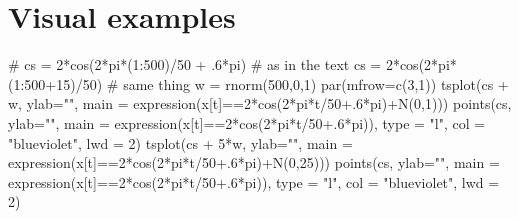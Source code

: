 \documentclass[
  letterpaper,
  DIV=11,
  numbers=noendperiod]{scrreprt}
\newenvironment{Shaded}{\begin{snugshade}}{\end{snugshade}}
\newcommand{\AttributeTok}[1]{\textcolor[rgb]{0.40,0.45,0.13}{#1}}
\newcommand{\CommentTok}[1]{\textcolor[rgb]{0.37,0.37,0.37}{#1}}
\newcommand{\DecValTok}[1]{\textcolor[rgb]{0.68,0.00,0.00}{#1}}
\newcommand{\FloatTok}[1]{\textcolor[rgb]{0.68,0.00,0.00}{#1}}
\newcommand{\FunctionTok}[1]{\textcolor[rgb]{0.28,0.35,0.67}{#1}}
\newcommand{\NormalTok}[1]{\textcolor[rgb]{0.00,0.23,0.31}{#1}}
\newcommand{\OtherTok}[1]{\textcolor[rgb]{0.00,0.23,0.31}{#1}}
\newcommand{\SpecialCharTok}[1]{\textcolor[rgb]{0.37,0.37,0.37}{#1}}
\newcommand{\StringTok}[1]{\textcolor[rgb]{0.13,0.47,0.30}{#1}}
\begin{document}
\section{Visual examples}\label{visual-examples-1}

\begin{Shaded}
\begin{Highlighting}[]
\CommentTok{\# cs = 2*cos(2*pi*(1:500)/50 + .6*pi)    \# as in the text}
\NormalTok{cs }\OtherTok{=} \DecValTok{2}\SpecialCharTok{*}\FunctionTok{cos}\NormalTok{(}\DecValTok{2}\SpecialCharTok{*}\NormalTok{pi}\SpecialCharTok{*}\NormalTok{(}\DecValTok{1}\SpecialCharTok{:}\DecValTok{500}\SpecialCharTok{+}\DecValTok{15}\NormalTok{)}\SpecialCharTok{/}\DecValTok{50}\NormalTok{)           }\CommentTok{\# same thing }
\NormalTok{w  }\OtherTok{=} \FunctionTok{rnorm}\NormalTok{(}\DecValTok{500}\NormalTok{,}\DecValTok{0}\NormalTok{,}\DecValTok{1}\NormalTok{)}
\FunctionTok{par}\NormalTok{(}\AttributeTok{mfrow=}\FunctionTok{c}\NormalTok{(}\DecValTok{3}\NormalTok{,}\DecValTok{1}\NormalTok{))   }
\FunctionTok{tsplot}\NormalTok{(cs }\SpecialCharTok{+}\NormalTok{ w, }\AttributeTok{ylab=}\StringTok{""}\NormalTok{, }\AttributeTok{main =} \FunctionTok{expression}\NormalTok{(x[t]}\SpecialCharTok{==}\DecValTok{2}\SpecialCharTok{*}\FunctionTok{cos}\NormalTok{(}\DecValTok{2}\SpecialCharTok{*}\NormalTok{pi}\SpecialCharTok{*}\NormalTok{t}\SpecialCharTok{/}\DecValTok{50}\FloatTok{+.6}\SpecialCharTok{*}\NormalTok{pi)}\SpecialCharTok{+}\FunctionTok{N}\NormalTok{(}\DecValTok{0}\NormalTok{,}\DecValTok{1}\NormalTok{)))}
\FunctionTok{points}\NormalTok{(cs, }\AttributeTok{ylab=}\StringTok{""}\NormalTok{, }\AttributeTok{main =} \FunctionTok{expression}\NormalTok{(x[t]}\SpecialCharTok{==}\DecValTok{2}\SpecialCharTok{*}\FunctionTok{cos}\NormalTok{(}\DecValTok{2}\SpecialCharTok{*}\NormalTok{pi}\SpecialCharTok{*}\NormalTok{t}\SpecialCharTok{/}\DecValTok{50}\FloatTok{+.6}\SpecialCharTok{*}\NormalTok{pi)), }\AttributeTok{type =} \StringTok{"l"}\NormalTok{, }\AttributeTok{col =} \StringTok{"blueviolet"}\NormalTok{, }\AttributeTok{lwd =} \DecValTok{2}\NormalTok{)}
\FunctionTok{tsplot}\NormalTok{(cs }\SpecialCharTok{+} \DecValTok{5}\SpecialCharTok{*}\NormalTok{w, }\AttributeTok{ylab=}\StringTok{""}\NormalTok{, }\AttributeTok{main =} \FunctionTok{expression}\NormalTok{(x[t]}\SpecialCharTok{==}\DecValTok{2}\SpecialCharTok{*}\FunctionTok{cos}\NormalTok{(}\DecValTok{2}\SpecialCharTok{*}\NormalTok{pi}\SpecialCharTok{*}\NormalTok{t}\SpecialCharTok{/}\DecValTok{50}\FloatTok{+.6}\SpecialCharTok{*}\NormalTok{pi)}\SpecialCharTok{+}\FunctionTok{N}\NormalTok{(}\DecValTok{0}\NormalTok{,}\DecValTok{25}\NormalTok{)))}
\FunctionTok{points}\NormalTok{(cs, }\AttributeTok{ylab=}\StringTok{""}\NormalTok{, }\AttributeTok{main =} \FunctionTok{expression}\NormalTok{(x[t]}\SpecialCharTok{==}\DecValTok{2}\SpecialCharTok{*}\FunctionTok{cos}\NormalTok{(}\DecValTok{2}\SpecialCharTok{*}\NormalTok{pi}\SpecialCharTok{*}\NormalTok{t}\SpecialCharTok{/}\DecValTok{50}\FloatTok{+.6}\SpecialCharTok{*}\NormalTok{pi)), }\AttributeTok{type =} \StringTok{"l"}\NormalTok{, }\AttributeTok{col =} \StringTok{"blueviolet"}\NormalTok{, }\AttributeTok{lwd =} \DecValTok{2}\NormalTok{)}
\end{Highlighting}
\end{Shaded}
\end{document}
